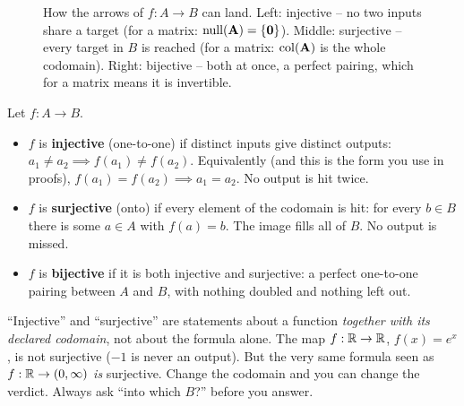 \begin{figure}[H]
\caption{How the arrows of $f:A\to B$ can land. Left: injective -- no two inputs share a
target (for a matrix: $\operatorname{null}(\mathbf{A}) = \{\mathbf{0}\}$). Middle: surjective -- every
target in $B$ is reached (for a matrix: $\operatorname{col}(\mathbf{A})$ is the whole codomain). Right:
bijective -- both at once, a perfect pairing, which for a matrix means it is invertible.}
\label{ch38:inj-surj-bij}
\end{figure}

\begin{formalbox}
Let $f : A \to B$.
\begin{itemize}
  \item $f$ is \textbf{injective} (one-to-one) if distinct inputs give distinct outputs:
        $a_1 \ne a_2 \implies f(a_1) \ne f(a_2)$. Equivalently (and this is the form you
        use in proofs), $f(a_1) = f(a_2) \implies a_1 = a_2$. No output is hit twice.
  \item $f$ is \textbf{surjective} (onto) if every element of the codomain is hit:
        for every $b \in B$ there is some $a \in A$ with $f(a) = b$. The image fills all
        of $B$. No output is missed.
  \item $f$ is \textbf{bijective} if it is both injective and surjective: a perfect
        one-to-one pairing between $A$ and $B$, with nothing doubled and nothing left out.
\end{itemize}
\end{formalbox}

\begin{trapbox}
``Injective'' and ``surjective'' are statements about a function \emph{together with its
declared codomain}, not about the formula alone. The map $f:\mathbb{R}\to\mathbb{R}$, $f(x)=e^x$, is not
surjective ($-1$ is never an output). But the very same formula seen as
$f:\mathbb{R}\to(0,\infty)$ \emph{is} surjective. Change the codomain and you can change the
verdict. Always ask ``into which $B$?'' before you answer.
\end{trapbox}

